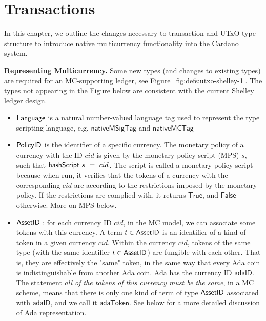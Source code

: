 \section{Transactions}
\label{sec:transactions}

In this chapter, we outline the changes necessary to transaction and
UTxO type structure to introduce native multicurrency functionality
into the Cardano
system.

\textbf{Representing Multicurrency.}
Some new types (and changes to existing types) are required for
an MC-supporting ledger, see Figure~\ref{fig:defs:utxo-shelley-1}.
The types not appearing in the Figure below are consistent with the
current Shelley ledger design.

\begin{itemize}

  \item $\mathsf{Language}$ is a natural number-valued language tag used to represent
  the type scripting language, e.g.
  $\mathsf{nativeMSigTag}$ and $\mathsf{nativeMCTag}$

  \item $\mathsf{PolicyID}$ is the identifier of a specific currency. The monetary
  policy of a currency with the ID $cid$ is given by the monetary policy script
  (MPS) $s$, such that $\mathsf{hashScript}~s~=~cid$. The script is called a
  monetary policy script because when run, it verifies that the tokens of a currency
  with the corresponding $cid$ are according to the restrictions imposed by the
  monetary policy. If the restrictions are complied with, it returns
  $\mathsf{True}$, and
  $\mathsf{False}$ otherwise. More on MPS below.

  \item $\mathsf{AssetID}$ : for each currency ID $cid$, in the MC model, we can associate
  some tokens with this currency. A term $t\in\mathsf{AssetID}$ is an identifier of a
  kind of token in a given currency $cid$. Within the currency $cid$,
  tokens of the same type (with the same identifier $t\in\mathsf{AssetID}$) are fungible
  with each other. That is, they are effectively the "same" token, in the same way that
  every Ada coin is indistinguishable from another Ada coin. Ada
  has the currency ID $\mathsf{adaID}$. The statement \textit{all of the tokens
  of this currency must
  be the same}, in a MC scheme, means that there is only one kind of term of
  type $\mathsf{AssetID}$ associated
  with $\mathsf{adaID}$, and we call it $\mathsf{adaToken}$.
  See below for a more detailed discussion of Ada representation.


\end{itemize}

